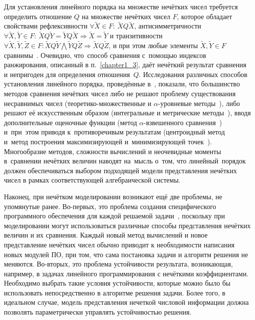 Для установления линейного порядка на множестве нечётких чисел требуется определить отношение $Q$ на множестве нечётких чисел $F$, которое обладает свойствами рефлексивности $\forall \tilde X \in F:\ \tilde X Q \tilde X$, антисимметричности $\forall \tilde X, \tilde Y \in F:\allowbreak\ \tilde X Q \tilde Y = \tilde Y Q \tilde X \Rightarrow \tilde X = \tilde Y$ и транзитивности $\forall \tilde X, \tilde Y, \tilde Z \in F:\allowbreak \tilde X Q \tilde Y \bigwedge \tilde Y Q \tilde Z \Rightarrow \tilde X Q \tilde Z$, и при этом любые элементы $\tilde X, \tilde Y \in F$ сравнимы~\cite{Vorontsov_Compare}. Очевидно, что~способ сравнения с~помощью индексов ранжирования, описанный в п.~\ref{chapter1_3}, даёт нечёткий результат сравнения и непригоден для определения отношения~$Q$. Исследования различных способов установления линейного порядка, проведённые в~\cite{Vorontsov_Compare}, показали, что большинство методов сравнения нечётких чисел либо не решают проблему существования несравнимых чисел (теоретико-множественные и $\alpha$-уровневые методы~\cite{Cheng_Comparison}), либо решают её искусственным образом (интегральные и метрические методы~\cite{Skorokhod, Ledeneva_Nguen}), вводя дополнительные оценочные функции (метод $\alpha$-взвешенного сравнения~\cite{Detyniecki_Yager, Ukhobotov_Comparison}) и~при~этом приводя к~противоречивым результатам (центроидный метод~\cite{Centroid} и~метод построения максимизирующей и~минимизирующей точек~\cite{Max_Min_Points}). Многообразие методов, сложности вычислений и неочевидные моменты в~сравнении нечётких величин наводят на~мысль о~том, что линейный~порядок должен обеспечиваться выбором подходящей модели представления нечётких чисел в рамках соответствующей алгебраической системы.

Наконец, при нечётком моделировании возникают ещё две проблемы, не упомянутые ранее. Во-первых, это проблема создания специфического программного обеспечения для каждой решаемой задачи~\cite{Uskov_Complex}, поскольку при моделировании могут использоваться различные способы представления нечётких величин и их сравнения. Каждый новый метод вычислений и новое представление нечётких чисел обычно приводит к необходимости написания новых модулей ПО, при том, что сама постановка задачи и алгоритм решения не меняются. Во-вторых, это проблема устойчивости результата, возникающая, например, в задачах линейного программирования с нечёткими коэффициентами.  Необходимо выбрать такие условия устойчивости, которые можно было бы использовать непосредственно в алгоритме решения задачи. Более того, в идеальном случае, модель представления нечеткой числовой информации должна позволять параметрически управлять устойчивостью решения.


